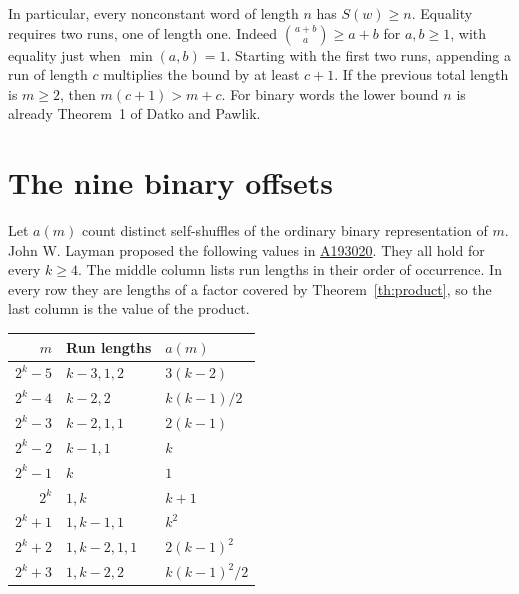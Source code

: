 \documentclass[11pt,letterpaper]{article}
\newcommand{\oeis}[1]{\href{https://oeis.org/A#1}{A#1}}
\begin{document}
In particular, every nonconstant word of length \(n\) has \(S(w)\ge n\). Equality requires two runs, one of length one. Indeed \(\binom{a+b}{a}\ge a+b\) for \(a,b\ge1\), with equality just when \(\min(a,b)=1\). Starting with the first two runs, appending a run of length \(c\) multiplies the bound by at least \(c+1\). If the previous total length is \(m\ge2\), then \(m(c+1)>m+c\). For binary words the lower bound \(n\) is already Theorem~1 of Datko and Pawlik.

\section{The nine binary offsets}
Let \(a(m)\) count distinct self-shuffles of the ordinary binary representation of \(m\). John W. Layman proposed the following values in \oeis{193020}. They all hold for every \(k\ge4\). The middle column lists run lengths in their order of occurrence. In every row they are lengths of a factor covered by Theorem~\ref{th:product}, so the last column is the value of the product.
\begin{center}
\begin{tabular}{rll}
\toprule
\(m\)&Run lengths&\(a(m)\)\\ \midrule
\(2^k-5\)&\(k-3,1,2\)&\(3(k-2)\)\\
\(2^k-4\)&\(k-2,2\)&\(k(k-1)/2\)\\
\(2^k-3\)&\(k-2,1,1\)&\(2(k-1)\)\\
\(2^k-2\)&\(k-1,1\)&\(k\)\\
\(2^k-1\)&\(k\)&\(1\)\\
\(2^k\)&\(1,k\)&\(k+1\)\\
\(2^k+1\)&\(1,k-1,1\)&\(k^2\)\\
\(2^k+2\)&\(1,k-2,1,1\)&\(2(k-1)^2\)\\
\(2^k+3\)&\(1,k-2,2\)&\(k(k-1)^2/2\)\\
\bottomrule
\end{tabular}
\end{center}
\end{document}
